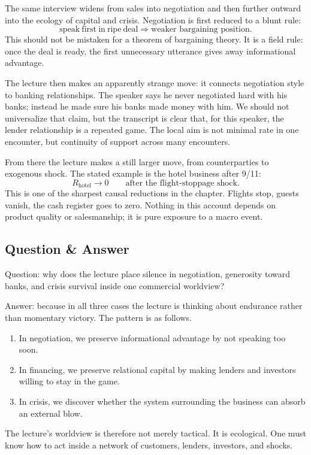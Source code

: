 The same interview widens from sales into negotiation and then further outward into the ecology of capital and crisis. Negotiation is first reduced to a blunt rule:
\begin{equation}
\mathrm{speak\ first\ in\ ripe\ deal} \Rightarrow \text{weaker bargaining position}.
\end{equation}
This should not be mistaken for a theorem of bargaining theory. It is a field rule: once the deal is ready, the first unnecessary utterance gives away informational advantage.

The lecture then makes an apparently strange move: it connects negotiation style to banking relationships. The speaker says he never negotiated hard with his banks; instead he made sure his banks made money with him. We should not universalize that claim, but the transcript is clear that, for this speaker, the lender relationship is a repeated game. The local aim is not minimal rate in one encounter, but continuity of support across many encounters.

From there the lecture makes a still larger move, from counterparties to exogenous shock. The stated example is the hotel business after 9/11:
\begin{equation}
R_{\text{hotel}} \to 0 \qquad \text{after the flight-stoppage shock.}
\end{equation}
This is one of the sharpest causal reductions in the chapter. Flights stop, guests vanish, the cash register goes to zero. Nothing in this account depends on product quality or salesmanship; it is pure exposure to a macro event.

\subsection{Question \& Answer}

Question: why does the lecture place silence in negotiation, generosity toward banks, and crisis survival inside one commercial worldview?

Answer: because in all three cases the lecture is thinking about endurance rather than momentary victory. The pattern is as follows.
\begin{enumerate}
\item In negotiation, we preserve informational advantage by not speaking too soon.
\item In financing, we preserve relational capital by making lenders and investors willing to stay in the game.
\item In crisis, we discover whether the system surrounding the business can absorb an external blow.
\end{enumerate}
The lecture's worldview is therefore not merely tactical. It is ecological. One must know how to act inside a network of customers, lenders, investors, and shocks.

